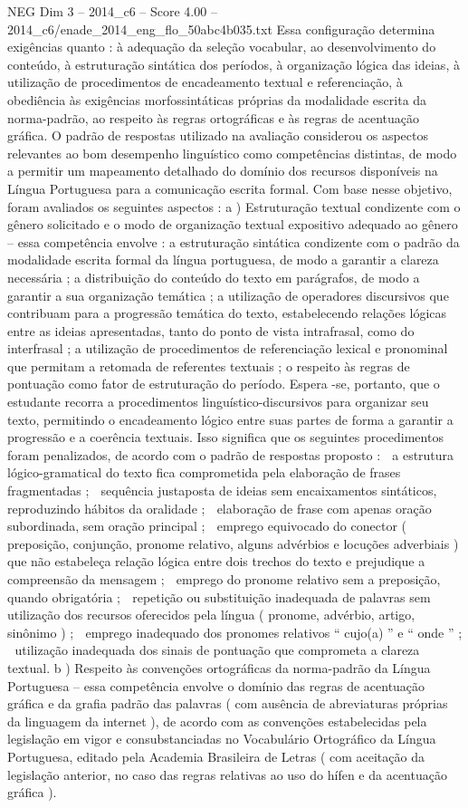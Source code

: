 \begin{textsample}{NEG Dim 3 – 2014\_c6 – Score 4.00 – 2014\_c6/enade\_2014\_eng\_flo\_50abc4b035.txt}
Essa configuração determina exigências quanto : à adequação da seleção vocabular, ao desenvolvimento do conteúdo, à estruturação sintática dos períodos, à organização lógica das ideias, à utilização de procedimentos de encadeamento textual e referenciação, à obediência às exigências morfossintáticas próprias da modalidade escrita da norma-padrão, ao respeito às regras ortográficas e às regras de acentuação gráfica.
O padrão de respostas utilizado na avaliação considerou os aspectos relevantes ao bom desempenho linguístico como competências distintas, de modo a permitir um mapeamento detalhado do domínio dos recursos disponíveis na Língua Portuguesa para a comunicação escrita formal.
Com base nesse objetivo, foram avaliados os seguintes aspectos : a ) Estruturação textual condizente com o gênero solicitado e o modo de organização textual expositivo adequado ao gênero – essa competência envolve : a estruturação sintática condizente com o padrão da modalidade escrita formal da língua portuguesa, de modo a garantir a clareza necessária ; a distribuição do conteúdo do texto em parágrafos, de modo a garantir a sua organização temática ; a utilização de operadores discursivos que contribuam para a progressão temática do texto, estabelecendo relações lógicas entre as ideias apresentadas, tanto do ponto de vista intrafrasal, como do interfrasal ; a utilização de procedimentos de referenciação lexical e pronominal que permitam a retomada de referentes textuais ; o respeito às regras de pontuação como fator de estruturação do período.
Espera -se, portanto, que o estudante recorra a procedimentos linguístico-discursivos para organizar seu texto, permitindo o encadeamento lógico entre suas partes de forma a garantir a progressão e a coerência textuais.
Isso significa que os seguintes procedimentos foram penalizados, de acordo com o padrão de respostas proposto :  a estrutura lógico-gramatical do texto fica comprometida pela elaboração de frases fragmentadas ;  sequência justaposta de ideias sem encaixamentos sintáticos, reproduzindo hábitos da oralidade ;  elaboração de frase com apenas oração subordinada, sem oração principal ;  emprego equivocado do conector ( preposição, conjunção, pronome relativo, alguns advérbios e locuções adverbiais ) que não estabeleça relação lógica entre dois trechos do texto e prejudique a compreensão da mensagem ;  emprego do pronome relativo sem a preposição, quando obrigatória ;  repetição ou substituição inadequada de palavras sem utilização dos recursos oferecidos pela língua ( pronome, advérbio, artigo, sinônimo ) ;  emprego inadequado dos pronomes relativos “ cujo(a) ” e “ onde ” ;  utilização inadequada dos sinais de pontuação que comprometa a clareza textual. b ) Respeito às convenções ortográficas da norma-padrão da Língua Portuguesa – essa competência envolve o domínio das regras de acentuação gráfica e da grafia padrão das palavras ( com ausência de abreviaturas próprias da linguagem da internet ), de acordo com as convenções estabelecidas pela legislação em vigor e consubstanciadas no Vocabulário Ortográfico da Língua Portuguesa, editado pela Academia Brasileira de Letras ( com aceitação da legislação anterior, no caso das regras relativas ao uso do hífen e da acentuação gráfica ).

\end{textsample}
